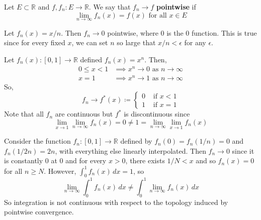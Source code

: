   \begin{definition}
    Let $E \subset \mathbb{R}$ and $f, f_n : E \to \mathbb{R}$. We say that $f_n \to f$ \textbf{pointwise} if 
    \begin{equation}
      \lim_{n \to \infty} f_n (x) = f(x) \text{ for all } x \in E
    \end{equation}
  \end{definition}

  \begin{example}
    Let $f_n (x) = x/n$. Then $f_n \to 0$ pointwise, where $0$ is the $0$ function. This is true since for every fixed $x$, we can set $n$ so large that $x/n < \epsilon$ for any $\epsilon$. 
  \end{example}

  \begin{example}
    Let $f_n (x) : [0, 1] \to \mathbb{R}$  defined $f_n (x) = x^n$. Then, 
    \begin{align}
      0 \leq x < 1 & \implies x^n \to 0 \text{ as } n \to \infty \\ 
      x = 1 & \implies x^n \to 1 \text{ as } n \to \infty
    \end{align}
    So, 
    \begin{equation}
      f_n \to f^\ast (x) \coloneqq \begin{cases} 
        0 & \text{ if } x < 1 \\ 
        1 & \text{ if } x = 1
      \end{cases}
    \end{equation}
    Note that all $f_n$ are continuous but $f^\ast$ is discontinuous since 
    \begin{equation}
      \lim_{x \to 1} \lim_{n \to \infty} f_n (x) = 0 \neq 1 = \lim_{n \to \infty} \lim_{x \to 1} f_n (x)
    \end{equation}
  \end{example}

  \begin{example}
    Consider the function $f_n: [0, 1] \to \mathbb{R}$ defined by $f_n (0) = f_n (1/n) = 0$ and $f_n (1/2n) = 2n$, with everything else linearly interpolated. Then $f_n \to 0$ since it is constantly $0$ at $0$ and for every $x > 0$, there exists $1/N < x$ and so $f_n (x) = 0$ for all $n \geq N$. However, $\int_0^1 f_n (x) \,dx = 1$, so 
    \begin{equation}
      \lim_{n \to \infty} \int_0^1 f_n (x)\,dx \neq \int_0^1 \lim_{n \to \infty} f_n (x)\,dx
    \end{equation}
    So integration is not continuous with respect to the topology induced by pointwise convergence. 
  \end{example}

